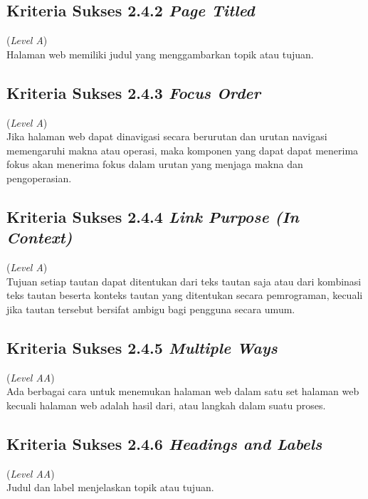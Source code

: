 \subsection{Kriteria Sukses 2.4.2 \textit{Page Titled}}
\label{subsec:kriteria_2.4.2}
(\textit{Level A}) \\

Halaman web memiliki judul yang menggambarkan topik atau tujuan.

\subsection{Kriteria Sukses 2.4.3 \textit{Focus Order}}
\label{subsec:kriteria_2.4.3}
(\textit{Level A}) \\

Jika halaman web dapat dinavigasi secara berurutan dan urutan navigasi memengaruhi makna atau operasi, maka komponen yang dapat dapat menerima fokus akan menerima fokus dalam urutan yang menjaga makna dan pengoperasian.

\subsection{Kriteria Sukses 2.4.4 \textit{Link Purpose (In Context)}}
\label{subsec:kriteria_2.4.4}
(\textit{Level A}) \\

Tujuan setiap tautan dapat ditentukan dari teks tautan saja atau dari kombinasi teks tautan beserta konteks tautan yang ditentukan secara pemrograman, kecuali jika tautan tersebut bersifat ambigu bagi pengguna secara umum.

\subsection{Kriteria Sukses 2.4.5 \textit{Multiple Ways}}
\label{subsec:kriteria_2.4.5}
(\textit{Level AA}) \\

Ada berbagai cara untuk menemukan halaman web dalam satu set halaman web kecuali halaman web adalah hasil dari, atau langkah dalam suatu proses.

\subsection{Kriteria Sukses 2.4.6 \textit{Headings and Labels}}
\label{subsec:kriteria_2.4.6}
(\textit{Level AA}) \\

Judul dan label menjelaskan topik atau tujuan.

